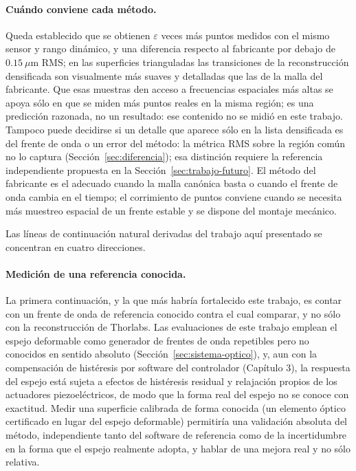 \documentclass[letterpaper,12pt,oneside]{book}
\makeatletter
\renewcommand\section{\@startsection{section}{1}{\z@}{-3.5ex \@plus -1ex \@minus -.2ex}{2.3ex \@plus.2ex}{\normalfont\Large\bfseries\raggedright}}
\makeatother
\begin{document}
\paragraph{Cuándo conviene cada método.} Queda establecido que se obtienen $\varepsilon$
veces más puntos medidos con el mismo sensor y rango dinámico, y una diferencia respecto
al fabricante por debajo de $0.15~\mu$m RMS; en las superficies trianguladas las
transiciones de la reconstrucción densificada son visualmente más suaves y detalladas que
las de la malla del fabricante. Que esas muestras den acceso a frecuencias espaciales más
altas se apoya sólo en que se miden más puntos reales en la misma región; es una
predicción razonada, no un resultado: ese contenido no se midió en este trabajo. Tampoco
puede decidirse si un detalle que aparece sólo en la lista densificada es del frente de
onda o un error del método: la métrica RMS sobre la región común no lo captura
(Sección~\ref{sec:diferencia}); esa distinción requiere la referencia independiente
propuesta en la Sección~\ref{sec:trabajo-futuro}. El método del fabricante es el adecuado
cuando la malla canónica basta o cuando el frente de onda cambia en el tiempo; el
corrimiento de puntos conviene cuando se necesita más muestreo espacial de un frente
estable y se dispone del montaje mecánico.

\section{Trabajo futuro y perspectivas}\label{sec:trabajo-futuro}

Las líneas de continuación natural derivadas del trabajo aquí presentado se concentran en
cuatro direcciones.

\paragraph{Medición de una referencia conocida.} La primera continuación, y la que más
habría fortalecido este trabajo, es contar con un frente de onda de referencia conocido
contra el cual comparar, y no sólo con la reconstrucción de Thorlabs. Las evaluaciones de este trabajo emplean
el espejo deformable como generador de frentes de onda repetibles pero no conocidos en
sentido absoluto (Sección~\ref{sec:sistema-optico}), y, aun con la compensación de
histéresis por software del controlador (Capítulo 3), la respuesta del espejo está sujeta
a efectos de histéresis residual y relajación propios de los actuadores piezoeléctricos,
de modo que la forma real del espejo no se conoce con exactitud. Medir una superficie
calibrada de forma conocida (un elemento óptico certificado en lugar del espejo
deformable) permitiría una validación absoluta del método, independiente tanto del
software de referencia como de la incertidumbre en la forma que el espejo realmente
adopta, y hablar de una mejora real y no sólo relativa.
\end{document}
